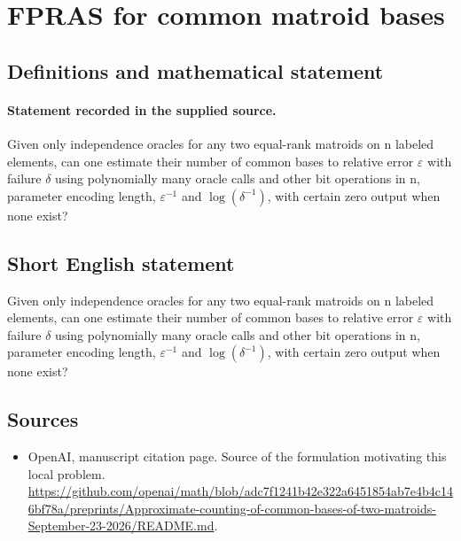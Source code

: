 \documentclass[11pt]{article}
\begin{document}
\section*{FPRAS for common matroid bases}\label{30007447}
\subsection{Definitions and mathematical statement}
\paragraph{Statement recorded in the supplied source.}
Given only independence oracles for any two equal-rank matroids on n labeled elements, can one estimate their number of common bases to relative error $\varepsilon $ with failure $\delta $ using polynomially many oracle calls and other bit operations in n, parameter encoding length, $\varepsilon ^{-1}$ and $\log (\delta ^{-1})$, with certain zero output when none exist?
\subsection{Short English statement}
Given only independence oracles for any two equal-rank matroids on n labeled elements, can one estimate their number of common bases to relative error $\varepsilon $ with failure $\delta $ using polynomially many oracle calls and other bit operations in n, parameter encoding length, $\varepsilon ^{-1}$ and $\log (\delta ^{-1})$, with certain zero output when none exist?
\subsection{Sources}
\begin{itemize}
\item[S1] OpenAI, manuscript citation page. Source of the formulation motivating this local problem.
\url{https://github.com/openai/math/blob/adc7f1241b42e322a6451854ab7e4b4c146bf78a/preprints/Approximate-counting-of-common-bases-of-two-matroids-September-23-2026/README.md}.
\end{itemize}
\end{document}
